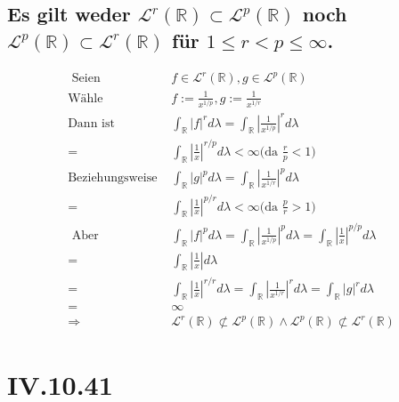 \documentclass[12pt,a4paper]{article}
\begin{document}
\subsection*{Es gilt weder $\mathscr{L}^r(\mathbb{R}) \subset \mathscr{L}^p(\mathbb{R})$ noch $\mathscr{L}^p(\mathbb{R}) \subset \mathscr{L}^r(\mathbb{R})$ für $1 \leq r < p \leq \infty$. }
\begin{align*}
	\text{ Seien } &f \in \mathscr{L}^r(\mathbb{R}), g \in \mathscr{L}^p(\mathbb{R})\\
	\text{Wähle } & f := \frac{1}{x^{1/p}}, g:= \frac{1}{x^{1/r}}\\
	\text{Dann ist } & \int_\mathbb{R}|f|^r d\lambda = \int_\mathbb{R}\left\lvert\frac{1}{x^{1/p}}\right\lvert^r d\lambda \\
	= & \int_\mathbb{R}\left\lvert \frac{1}{x}\right\lvert^{r/p} d\lambda < \infty\bigg(\text{da } \frac{r}{p}<1\bigg)\\
	\text{Beziehungsweise } & \int_\mathbb{R}|g|^p d\lambda = \int_\mathbb{R}\left\lvert\frac{1}{x^{1/r}}\right\lvert^p d\lambda \\
	= & \int_\mathbb{R}\left\lvert \frac{1}{x}\right\lvert^{p/r} d\lambda < \infty\bigg(\text{da } \frac{p}{r}>1\bigg)\\
	\text{ Aber } & \int_\mathbb{R}|f|^p d\lambda =\int_\mathbb{R}\left\lvert\frac{1}{x^{1/p}}\right\lvert^p d\lambda= \int_\mathbb{R}\left\lvert \frac{1}{x}\right\lvert^{p/p} d\lambda \\	
	= & \int_\mathbb{R}\left\lvert \frac{1}{x}\right\lvert d\lambda \\
	= & \int_\mathbb{R}\left\lvert \frac{1}{x}\right\lvert^{r/r} d\lambda = \int_\mathbb{R}\left\lvert\frac{1}{x^{1/r}}\right\lvert^r d\lambda  = \int_\mathbb{R}|g|^r d\lambda \\
	= & \infty\\
	\Rightarrow & \mathscr{L}^r(\mathbb{R}) \not\subset \mathscr{L}^p(\mathbb{R}) \land\mathscr{L}^p(\mathbb{R}) \not\subset \mathscr{L}^r(\mathbb{R})
\end{align*}


\section*{IV.10.41}
\end{document}
